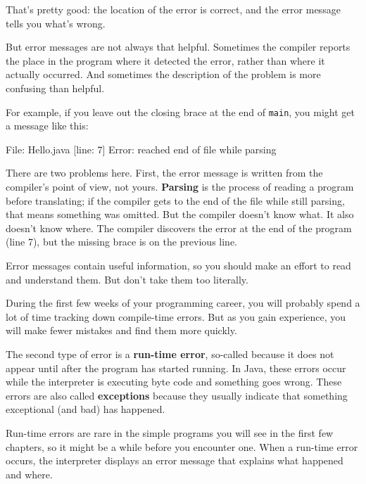\documentclass[12pt]{book}
\makeatletter
\theoremstyle{exercise}
\newcommand{\java}[1]{\verb"#1"}
\renewcommand\subsection{\@startsection{subsection}{2}{\z@}%
    {-3.25ex\@plus -1ex \@minus -.2ex}%
    {0.3ex \@plus .2ex}%
    {\normalfont\large\bfseries}}
\newcommand{\java}[1]{\lstinline{#1}} %
\makeatother
\begin{document}
That's pretty good: the location of the error is correct, and the error message tells you what's wrong.

But error messages are not always that helpful.
Sometimes the compiler reports the place in the program where it detected the error, rather than where it actually occurred.
And sometimes the description of the problem is more confusing than helpful.

For example, if you leave out the closing brace at the end of \java{main}, you might get a message like this:

\begin{stdout}
File: Hello.java  [line: 7]
Error: reached end of file while parsing
\end{stdout}

There are two problems here.
First, the error message is written from the compiler's point of view, not yours.
{\bf Parsing} is the process of reading a program before translating; if the compiler gets to the end of the file while still parsing, that means something was omitted.
But the compiler doesn't know what.
It also doesn't know where.
The compiler discovers the error at the end of the program (line 7), but the missing brace is on the previous line.

Error messages contain useful information, so you should make an effort to read and understand them.
But don't take them too literally.

During the first few weeks of your programming career, you will probably spend a lot of time tracking down compile-time errors.
But as you gain experience, you will make fewer mistakes and find them more quickly.



The second type of error is a {\bf run-time error}, so-called because it does not appear until after the program has started running.
In Java, these errors occur while the interpreter is executing byte code and something goes wrong.
These errors are also called {\bf exceptions} because they usually indicate that something exceptional (and bad) has happened.

Run-time errors are rare in the simple programs you will see in the first few chapters, so it might be a while before you encounter one.
When a run-time error occurs, the interpreter displays an error message that explains what happened and where.
\end{document}
